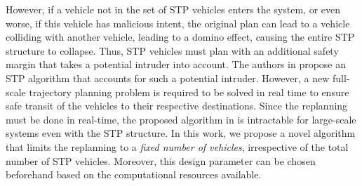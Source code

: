 However, if a vehicle not in the set of STP vehicles enters the system, or even worse, if this vehicle has malicious intent, the original plan can lead to a vehicle colliding with another vehicle, leading to a domino effect, causing the entire STP structure to collapse. Thus, STP vehicles must plan with an additional safety margin that takes a potential intruder into account. The authors in \cite{Chen2016d} propose an STP algorithm that accounts for such a potential intruder. However, a new full-scale trajectory planning problem is required to be solved in real time to ensure safe transit of the vehicles to their respective destinations. Since the replanning must be done in real-time, the proposed algorithm in \cite{Chen2016d} is intractable for large-scale systems even with the STP structure. In this work, we propose a novel algorithm that limits the replanning to a \textit{fixed number of vehicles}, irrespective of the total number of STP vehicles. Moreover, this design parameter can be chosen beforehand based on the computational resources available. 

